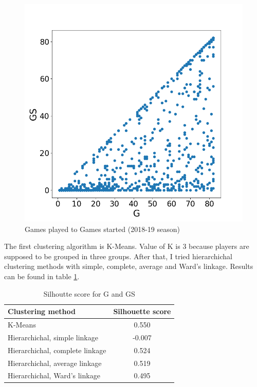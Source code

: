 \documentclass[a4paper]{article}
\begin{document}
\begin{figure}[h!]
\begin{center}
\includegraphics[scale=0.3]{g_to_gs.png}
\end{center}
\caption{Games played to Games started (2018-19 season)}
\label{plt:g_gs}
\end{figure}

The first clustering algorithm is K-Means. Value of K is 3 because players are supposed to be grouped in three groups. After that, I tried hierarchichal clustering methods with simple, complete, average and Ward's linkage. Results can be found in table \ref{tab:clust_score_k3}.

\begin{table}[!h]
\begin{center}
\begin{tabular}{|l|c|} \hline
\textbf{Clustering method} & \textbf{Silhouette score}  \\ \hline
K-Means & 0.550  \\ \hline
Hierarchichal, simple linkage & -0.007  \\ \hline
Hierarchichal, complete linkage & 0.524  \\ \hline
Hierarchichal, average linkage &  0.519  \\ \hline
Hierarchichal, Ward's linkage & 0.495  \\ \hline
\end{tabular}
\caption{Silhoutte score for G and GS}
\label{tab:clust_score_k3}
\end{center}
\end{table}
\end{document}
